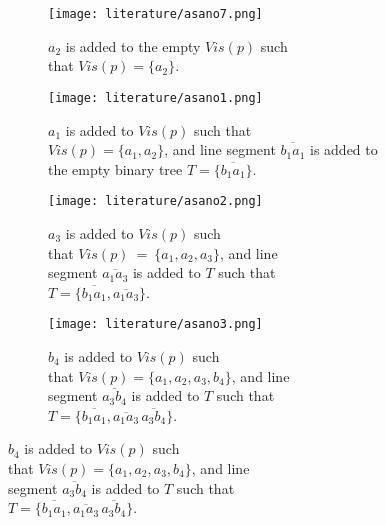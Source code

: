 \begin{figure}[h!]
	\centering
	\begin{subfigure}{0.45\linewidth}
		\texttt{[image: literature/asano7.png]}
		\caption{$a_2$ is added to the empty $Vis(p)$ such \\ that $Vis(p) = \{a_2\}$.}
		\label{fig:asano1}
	\end{subfigure}
	\begin{subfigure}{0.45\linewidth}
		\texttt{[image: literature/asano1.png]}
		\caption{$a_1$ is added to $Vis(p)$ such that \\ $Vis(p) = \{a_1, a_2\}$, and line segment $\overline{b_1a_1}$ is added to the empty binary tree $T = \{\overline{b_1a_1}\}$.}
	\end{subfigure}
	\begin{subfigure}{0.45\linewidth}
		\texttt{[image: literature/asano2.png]}
		\caption{$a_3$ is added to $Vis(p)$ such \\ that $Vis(p)~=~\{a_1, a_2, a_3\}$,  and line \\ segment $\overline{a_1a_3}$ is added to $T$ such that \\ $T = \{\overline{b_1a_1}, \overline{a_1a_3}\}$.}
	\end{subfigure}
	\begin{subfigure}{0.45\linewidth}
		\texttt{[image: literature/asano3.png]}
		\caption{$b_4$ is added to $Vis(p)$ such \\ that $Vis(p)=\{a_1, a_2, a_3, b_4\}$, and line \\ segment $\overline{a_3b_4}$ is added to $T$ such that \\ $T = \{\overline{b_1a_1}, \overline{a_1a_3}\, \overline{a_3b_4}\}$.}
	\end{subfigure}
\end{figure}
